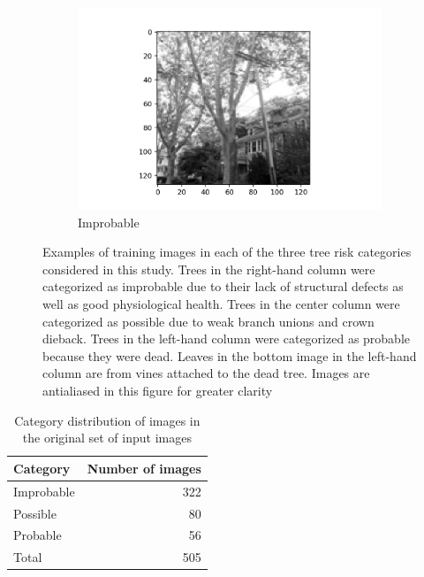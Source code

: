 \documentclass[Journal,letterpaper, SingleSpace, InsideFigs]{ascelike-new}
\begin{document}
\begin{figure}[ht]
\begin{subfigure}[t]{.32\linewidth}
    \includegraphics[width=\textwidth,keepaspectratio=true]{improbable-example-2}
    \caption{Improbable}
  \end{subfigure}
  \caption{Examples of training images in each of the three tree risk categories considered in this study.
  Trees in the right-hand column were categorized as improbable due to their lack of structural defects as well as good physiological health. Trees in the center column were categorized as possible due to weak branch unions and crown dieback. Trees in the left-hand column were categorized as probable because they were dead. Leaves in the bottom image in the left-hand column are from vines attached to the dead tree. Images are antialiased in this figure for greater clarity}
  \label{fig:raw_images}
\end{figure}

\begin{table}[h!]\small
    \centering
    \begin{tabular}{l r}\toprule
    \bf Category     & \bf Number of images  \\ \midrule
    Improbable & 322\\
    Possible & 80 \\
    Probable & 56 \\\midrule
    Total & 505 \\\bottomrule
    \end{tabular}
    \caption{Category distribution of images in the original set of input images}
    \label{tab:classdist}
\end{table}
\end{document}
